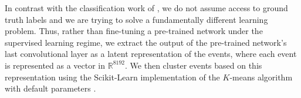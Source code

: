 \documentclass[review,sort&compress]{elsarticle}
\newcommand{\R}{\mathbb{R}}
\begin{document}

In contrast with the classification work of \citet{Kuchera2019}, we do not assume access to ground truth labels and we are trying to solve a fundamentally different learning problem. Thus, rather than fine-tuning a pre-trained network under the supervised learning regime, we extract the output of the pre-trained network's last convolutional layer as a latent representation of the events, where each event is represented as a vector in $\R^{8192}$. We then cluster events based on this representation using the Scikit-Learn implementation of the $K$-means algorithm with default parameters \cite{Pedregosa2011}.


\end{document}
